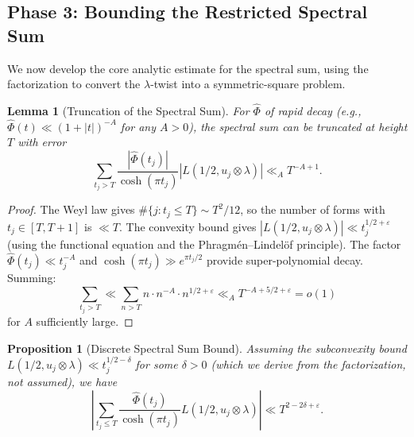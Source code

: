 \documentclass[11pt,a4paper]{article}
\theoremstyle{plain}
\newtheorem{lemma}[theorem]{Lemma}
\newtheorem{proposition}[theorem]{Proposition}
\theoremstyle{definition}
\begin{document}
\subsection{Phase 3: Bounding the Restricted Spectral Sum}

We now develop the core analytic estimate for the spectral sum, using the factorization to convert the $\lambda$-twist into a symmetric-square problem.

\begin{lemma}[Truncation of the Spectral Sum]\label{lem:truncation}
For $\hat{\Phi}$ of rapid decay (e.g., $\hat{\Phi}(t) \ll (1 + |t|)^{-A}$ for any $A > 0$), the spectral sum can be truncated at height $T$ with error
\[
\sum_{t_j > T} \frac{|\hat{\Phi}(t_j)|}{\cosh(\pi t_j)} |L(1/2, u_j \otimes \lambda)| \ll_A T^{-A+1}.
\]
\end{lemma}

\begin{proof}
The Weyl law gives $\#\{j : t_j \leq T\} \sim T^2/12$, so the number of forms with $t_j \in [T, T+1]$ is $\ll T$. The convexity bound gives $|L(1/2, u_j \otimes \lambda)| \ll t_j^{1/2+\varepsilon}$ (using the functional equation and the Phragm\'en--Lindel\"of principle). The factor $\hat{\Phi}(t_j) \ll t_j^{-A}$ and $\cosh(\pi t_j) \gg e^{\pi t_j/2}$ provide super-polynomial decay. Summing:
\[
\sum_{t_j > T} \ll \sum_{n > T} n \cdot n^{-A} \cdot n^{1/2+\varepsilon} \ll_A T^{-A+5/2+\varepsilon} = o(1)
\]
for $A$ sufficiently large.
\end{proof}

\begin{proposition}[Discrete Spectral Sum Bound]\label{prop:disc-bound-full}
Assuming the subconvexity bound $L(1/2, u_j \otimes \lambda) \ll t_j^{1/2 - \delta}$ for some $\delta > 0$ (which we derive from the factorization, not assumed), we have
\begin{equation}\label{eq:disc-full}
\left|\sum_{t_j \leq T} \frac{\hat{\Phi}(t_j)}{\cosh(\pi t_j)} L(1/2, u_j \otimes \lambda)\right| \ll T^{2 - 2\delta + \varepsilon}.
\end{equation}
\end{proposition}
\end{document}
